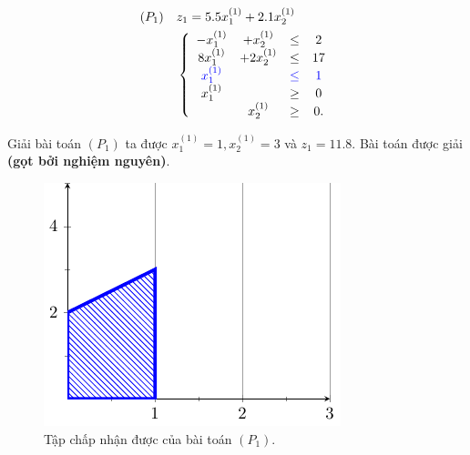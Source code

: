 \documentclass[10pt]{beamer}
\begin{document}
\begin{frame}
    \begin{equation*}
        \begin{split}
            (P_1) \quad &z_1= 5.5x^{(1)}_1 + 2.1x^{(1)}_2 \\
            & \left\{\begin{array} {cccc}
            -x^{(1)}_1 &+ x^{(1)}_2 &\leq& 2 \\
            8x^{(1)}_1 &+ 2x^{(1)}_2 &\leq& 17 \\
            \color{blue} x^{(1)}_1 && \color{blue} \leq &\color{blue} 1 \\
            x^{(1)}_1 &&\geq& 0 \\
            &x^{(1)}_2 &\geq& 0. \\
            \end{array}\right. \\
        \end{split}
    \end{equation*}
\end{frame}

\begin{frame}
    Giải bài toán $(P_1)$ ta được $x^{(1)}_1=1, x^{(1)}_2=3$ và $z_1=11.8$. Bài toán được giải \textbf{(gọt bởi nghiệm nguyên)}.
    \vspace{0.5cm}
    \begin{figure}[h]
        \centering
        \includegraphics[width=0.4\linewidth]{hinh2.pdf}
        \caption{Tập chấp nhận được của bài toán $(P_1)$.}
    \end{figure}
\end{frame}
\end{document}
